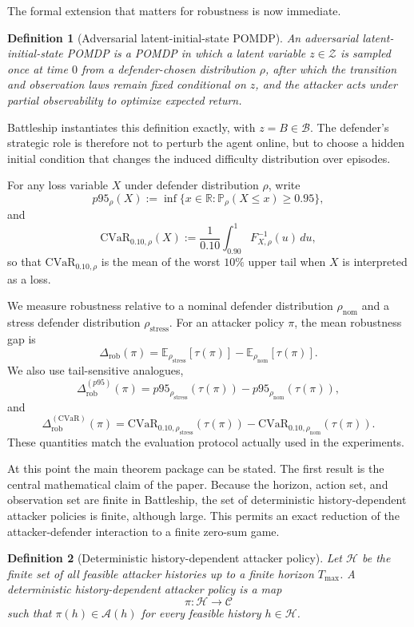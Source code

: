 \documentclass[11pt]{article}
\newtheorem{definition}{Definition}
\newcommand{\A}{\mathcal{A}}
\newcommand{\Zset}{\mathcal{Z}}
\newcommand{\Bset}{\mathcal{B}}
\newcommand{\Hset}{\mathcal{H}}
\newcommand{\E}{\mathbb{E}}
\newcommand{\Prob}{\mathbb{P}}
\newcommand{\tauT}{\tau}
\newcommand{\rhoNom}{\rho_{\mathrm{nom}}}
\newcommand{\rhoStress}{\rho_{\mathrm{stress}}}
\newcommand{\Gap}{\Delta_{\mathrm{rob}}}
\newcommand{\cvar}{\mathrm{CVaR}}
\begin{document}
The formal extension that matters for robustness is now immediate.

\begin{definition}[Adversarial latent-initial-state POMDP]
An adversarial latent-initial-state POMDP is a POMDP in which a latent variable $z\in\Zset$ is sampled once at time $0$ from a defender-chosen distribution $\rho$, after which the transition and observation laws remain fixed conditional on $z$, and the attacker acts under partial observability to optimize expected return.
\end{definition}

Battleship instantiates this definition exactly, with $z=B\in\Bset$. The defender's strategic role is therefore not to perturb the agent online, but to choose a hidden initial condition that changes the induced difficulty distribution over episodes.

For any loss variable $X$ under defender distribution $\rho$, write
\[
p95_{\rho}(X)
:=
\inf\{x\in\mathbb{R}: \Prob_{\rho}(X\le x)\ge 0.95\},
\]
and
\[
\cvar_{0.10,\rho}(X)
:=
\frac{1}{0.10}\int_{0.90}^{1}F^{-1}_{X,\rho}(u)\,du,
\]
so that $\cvar_{0.10,\rho}$ is the mean of the worst $10\%$ upper tail when $X$ is interpreted as a loss.

We measure robustness relative to a nominal defender distribution $\rhoNom$ and a stress defender distribution $\rhoStress$. For an attacker policy $\pi$, the mean robustness gap is
\[
\Gap(\pi)=\E_{\rhoStress}[\tauT(\pi)]-\E_{\rhoNom}[\tauT(\pi)].
\]
We also use tail-sensitive analogues,
\[
\Gap^{(p95)}(\pi)=p95_{\rhoStress}(\tauT(\pi))-p95_{\rhoNom}(\tauT(\pi)),
\]
and
\[
\Gap^{(\cvar)}(\pi)=\cvar_{0.10,\rhoStress}(\tauT(\pi))-\cvar_{0.10,\rhoNom}(\tauT(\pi)).
\]
These quantities match the evaluation protocol actually used in the experiments.

At this point the main theorem package can be stated. The first result is the central mathematical claim of the paper. Because the horizon, action set, and observation set are finite in Battleship, the set of deterministic history-dependent attacker policies is finite, although large. This permits an exact reduction of the attacker-defender interaction to a finite zero-sum game.

\begin{definition}[Deterministic history-dependent attacker policy]
Let $\Hset$ be the finite set of all feasible attacker histories up to a finite horizon $T_{\max}$. A deterministic history-dependent attacker policy is a map
\[
\pi:\Hset\to\mathcal{C}
\]
such that $\pi(h)\in\A(h)$ for every feasible history $h\in\Hset$.
\end{definition}
\end{document}
